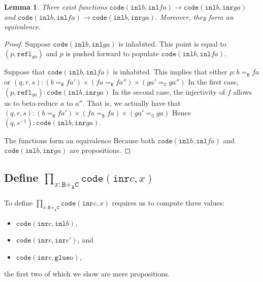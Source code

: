 \documentclass[12pt]{amsart}
\newcommand{\inv}{^{-1}}
\newcommand{\type}[1]{\mathtt{#1}}
\newcommand{\tin}{\colon}
\newcommand{\A}{\type{A}}
\newcommand{\B}{\type{B}}
\newcommand{\C}{\type{C}}
\newcommand{\BAC}{\B +_{\A} \C}
\newcommand{\inl}{\type{inl}}
\newcommand{\inr}{\type{inr}}
\newcommand{\glue}{\type{glue}}
\newcommand{\refl}{\type{refl}}
\newcommand{\code}{\type{code}}
\newtheorem{lemma}{Lemma}
\theoremstyle{remark}
\theoremstyle{definition}
\begin{document}
\begin{lemma} \label{thm:code-faga-populated-empty}
%
  There exist functions
  \(
      \code ( \inl b , \inl fa ) \to \code ( \inl b , \inr ga )
  \)
  and
  \(
      \code ( \inl b , \inl fa ) \to \code ( \inl b , \inr ga ).
  \)
  Moreover, they form an equivalence.
%
\end{lemma}
\begin{proof}
%  
  Suppose
  \(
      \code ( \inl b , \inl ga )
  \)
  is inhabited. This point is equal to
  \(
      ( p , \refl_{ga} )
  \)
  and \( p \) is pushed forward to populate
  \(
      \code ( \inl b , \inl fa ). 
  \)
  \par
  
  Suppose that
  \(
       \code ( \inl b , \inl fa )
  \)
  is inhabited.  This implies that either
  \(
       p \tin b =_\B fa 
  \)
  or
  \(
     ( q,r,s ) \tin
     ( b =_\B fa' ) \times ( fa =_\B fa'' ) \times ( ga' =_\C ga'' )
  \)
  In the first case,
  \(
      ( p , \refl_{ga} ) \tin \code ( \inl b , \inr ga )
  \)
  In the second case, the injectivity of \( f \) allows us to
  beta-reduce \( a \) to \( a'' \). That is, we actually have that
  \(
      (q,r,s) \tin
      ( b =_\B fa' ) \times ( fa =_\B fa ) \times ( ga' =_\C ga )
  \)
  Hence
  \(
      ( q , s\inv ) \tin \code ( \inl b , \inr ga ).
  \)

  The functions form an equivalence Because both
  \(
      \code ( \inl b , \inl fa )
  \)
  and
  \(
      \code ( \inl b , \inr ga )
  \)
  are propositions.
%  
\end{proof}


\subsection{Define \( \prod_{x \tin \BAC } \code ( \inr c , x ) \)} 
\label{sec:codecx}

To define
%
\(
    \prod\limits_{x \tin \BAC} \code ( \inr c , x  )
\)
% 
requires us to compute three values:
\begin{itemize}
\item \( \code ( \inr c , \inl b ) \),
\item \( \code ( \inr c , \inr c' ) \), and
\item \( \code ( \inr c , \glue a ) \),
\end{itemize}
the first two of which we show are mere propositions.
\end{document}

